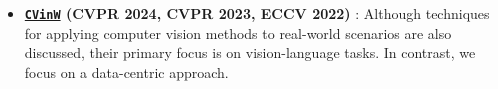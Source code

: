 \documentclass{article}
\begin{document}
\begin{itemize}
    \item
    {\bf
        \href{https://computer-vision-in-the-wild.github.io/cvpr-2024}{\texttt{CVinW}} (CVPR 2024, CVPR 2023, ECCV 2022)
    }:
    Although techniques for applying computer vision methods to real-world scenarios are also discussed, their primary focus is on vision-language tasks. In contrast, we focus on a data-centric approach.



\end{itemize}
\end{document}
